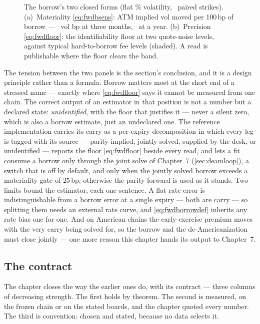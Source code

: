 \begin{figure}[htbp]
\centering
{}
\caption{The borrow's two closed forms (flat
\MacFwdBorrowSigmaPct\% volatility, \MacFwdBorrowNPairs\ paired
strikes).  (a)~Materiality \eqref{eq:fwdbsens}: ATM implied vol
moved per 100\,bp of borrow --- \MacFwdBorrowSensQBp\ vol bp at
three months, \MacFwdBorrowSensYBp\ at a year.  (b)~Precision
\eqref{eq:fwdfloor}: the identifiability floor at two quote-noise
levels, against typical hard-to-borrow fee levels (shaded).  A read
is publishable where the floor clears the band.}
\label{fig:fwdborrow}
\end{figure}

The tension between the two panels is the section's conclusion, and
it is a design principle rather than a formula.  Borrow matters most
at the short end of a stressed name --- exactly where
\eqref{eq:fwdfloor} says it cannot be measured from one chain.  The
correct output of an estimator in that position is not a number but a
declared state: \emph{unidentified}, with the floor
that justifies it --- never a silent zero, which is also a borrow
estimate, just an undeclared one.  The reference implementation
carries its carry as a per-expiry decomposition in which every leg is
tagged with its source --- parity-implied, jointly solved, supplied by
the desk, or unidentified --- reports the floor \eqref{eq:fwdfloor}
beside every read, and lets a fit consume a borrow only through the
joint solve of Chapter~7 (\cref{sec:deamloop}), a switch that is off
by default, and only when the jointly solved borrow exceeds a
materiality gate of $25$\,bp; otherwise the parity forward is used as
it stands.  Two limits bound the estimator,
each one sentence.  A flat rate error is indistinguishable
from a borrow error at a single expiry --- both are carry --- so
splitting them needs an external rate curve, and
\eqref{eq:fwdborrowdef} inherits any rate bias one for one.  And on
American chains the early-exercise premium moves with the very carry
being solved for, so the borrow and the de-Americanization must close
jointly --- one more reason this chapter hands its output to
Chapter~7.

\subsection{The contract}
\label{sec:fwdcontract}

The chapter closes the way the earlier ones do, with its contract ---
three columns of decreasing strength.  The first holds by theorem.
The second is measured, on the frozen chain or on the stated boards,
and the chapter quoted every number.  The third is convention:
chosen and stated, because no data selects it.

